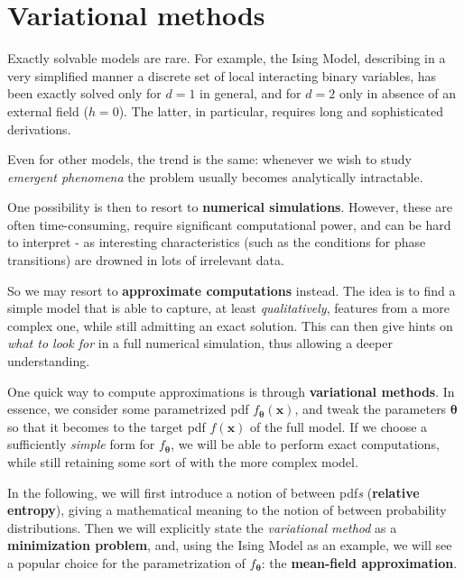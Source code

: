 \documentclass[../../main.tex]{subfiles}
\begin{document}
\chapter{Variational methods}
Exactly solvable models are rare. For example, the Ising Model, describing in a very simplified manner a discrete set of local interacting binary variables, has been exactly solved only for $d=1$ in general, and for $d=2$ only in absence of an external field ($h=0$). The latter, in particular, requires long and sophisticated derivations.

Even for other models, the trend is the same: whenever we wish to study \textit{emergent phenomena} the problem usually becomes analytically intractable.

\medskip

One possibility is then to resort to \textbf{numerical simulations}. However, these are often time-consuming, require significant computational power, and can be hard to interpret - as interesting  characteristics (such as the conditions for phase transitions) are drowned in lots of irrelevant  data. 

\medskip

So we may resort to \textbf{approximate computations} instead. The idea is to find a simple model that is able to capture, at least \textit{qualitatively}, features from a more complex one, while still admitting an exact solution. This can then give hints on \textit{what to look for} in a full numerical simulation, thus allowing a deeper understanding. 

\medskip

One quick way to compute approximations is through \textbf{variational methods}. In essence, we consider some parametrized pdf $f_{\bm{\theta}}(\bm{x})$, and tweak the parameters $\bm{\bm{\theta}}$ so that it becomes  to the target pdf $f(\bm{x})$ of the full model. If we choose a sufficiently \textit{simple} form for $f_{\bm{\theta}}$, we will be able to perform exact computations, while still retaining some sort of  with the more complex model.

\medskip

In the following, we will first introduce a notion of  between pdf\textit{s} (\textbf{relative entropy}), giving a mathematical meaning to the notion of  between probability distributions. Then we will explicitly state the \textit{variational method} as a \textbf{minimization problem}, and, using the Ising Model as an example, we will see a popular choice for the parametrization of $f_{\bm{\theta}}$: the \textbf{mean-field approximation}.  
\end{document}
